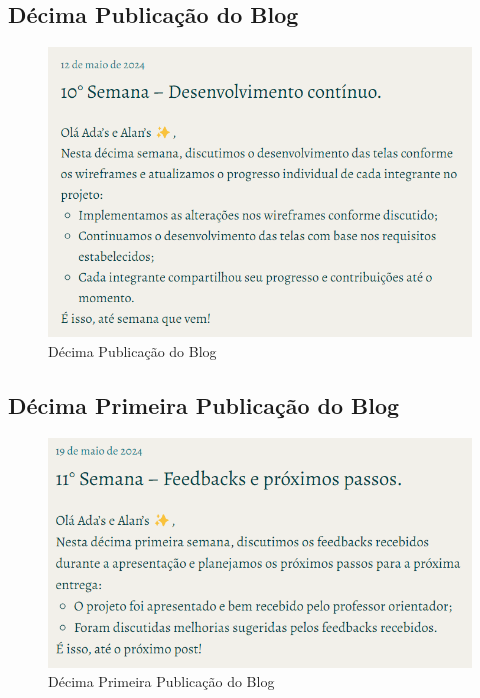 \begin{apendicesenv}
\subsection*{Décima Publicação do Blog}
\begin{figure}[H]
    \centering
    \includegraphics[width=1.0\linewidth]{images/Post10.png}
    \caption{Décima Publicação do Blog}
    \label{fig:decima}
\end{figure}

\subsection*{Décima Primeira Publicação do Blog}
\begin{figure}[H]
    \centering
    \includegraphics[width=1.0\linewidth]{images/Post11.png}
    \caption{Décima Primeira Publicação do Blog}
    \label{fig:decima primeira}
\end{figure}

\end{apendicesenv}
